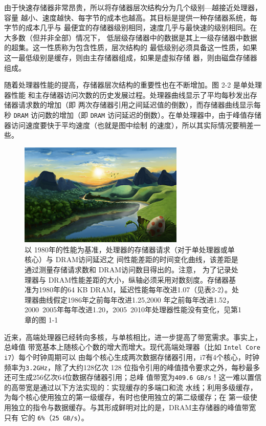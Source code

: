 由于快速存储器非常昂贵，所以将存储器层次结构分为几个级别—越接近处理器，容量
越小、速度越快、每字节的成本也越高。其目标是提供一种存储器系统，每字节的成本几乎与
最便宜的存储器级别相同，速度几乎与最快速的级别相同。在大多数（但并非全部）情况下，
低层级存储器中的数据是其上一级存储器中数据的超集。这一性质称为包含性质，层次结构的
最低级别必须具备这一性质，如果这一最低级别是缓存，则由主存储器组成，如果是虚拟存储
器，则由磁盘存储器组成。

随着处理器性能的提高，存储器层次结构的重要性也在不断增加。图 2-2 是单处理器性能
和主存储器访问次数的历史发展过程。处理器曲线显示了平均每秒发出存储器请求数的增加（即
两次存储器引用之间延迟值的倒数），而存储器曲线显示每秒 \verb|DRAM| 访问数的增加（即 \verb|DRAM|
访问延迟的倒数）。在单处理器中，由于峰值存储器访问速度要快于平均速度（也就是图中绘制
的速度），所以其实际情况要稍差一些。

\begin{figure}[!htb]
    \centering
	\includegraphics[width=0.7\textwidth]{imgs/sam.png}
	\caption{以 1980年的性能为基准，处理器的存储器请求（对于单处理器或单核心）与 DRAM访问延迟之
            间性能差距的时间变化曲线，该差距是通过测量存储请求数和 DRAM访问数目得出的。注意，
            为了记录处理器与 DRAM性能差距的大小，纵轴必须采用对数刻度。存储器基准为1980年的64
            KB DRAM，延迟性能每年改进1.07（见表2-2）。处理器曲线假定1986年之前每年改进1.25,2000
            年之前每年改进1.52，2000~2005年每年改进1.20，2005~2010年处理器性能没有变化，见第1
            章的图 1-1}
\end{figure}

近来，高端处理器已经转向多核，与单核相比，进一步提高了带宽需求。事实上，总峰值
带宽基本上随核心个数的增大而增大。现代高端处理器（比如 \verb|Intel Core i7|）每个时钟周期可以
由每个核心生成两次数据存储器引用，i7有4个核心，时钟频率为\verb|3.2GHz|，除了大约128亿次
128 位指令引用的峰值措令要求之外，每秒最多还可生成256亿次64位数据存储器引用；总峰
值带宽为\verb|409.6 GB/s|！这一难以置信的高带宽是通过以下方法实现的：实现缓存的多端口和流
水线；利用多级缓存，为每个核心使用独立的第一级缓存，有时也使用独立的第二级缓存；在
第一级使用独立的指令与数据缓存。与其形成鲜明对比的是，DRAM主存储器的峰值带宽只有
它的 \verb|6%|（\verb|25 GB/s|）。

